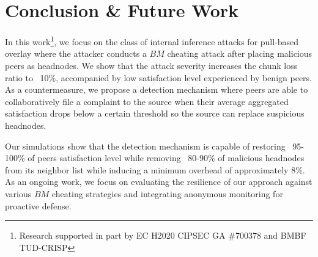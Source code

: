 \section{Conclusion \& Future Work}
\label{sec:conclusion}
In this work\footnote{Research supported in part by EC H2020 CIPSEC GA \#700378 and BMBF TUD-CRISP}, we focus on the class of internal inference attacks for pull-based overlay where the attacker conducts a $BM$ cheating attack after placing malicious peers as headnodes.
We show that the attack severity increases the chunk loss ratio to ~10\%, accompanied by low satisfaction level experienced by benign peers.
As a countermeasure, we propose a detection mechanism where peers are able to collaboratively file a complaint to the source when their average aggregated satisfaction drops below a certain threshold so the source can replace suspicious headnodes.

Our simulations show that the detection mechanism is capable of restoring ~95-100\% of peers satisfaction level while removing ~80-90\% of malicious headnodes from its neighbor list while inducing a minimum overhead of approximately 8\%.
As an ongoing work, we focus on evaluating the resilience of our approach against various $BM$ cheating strategies and integrating anonymous monitoring for proactive defense.